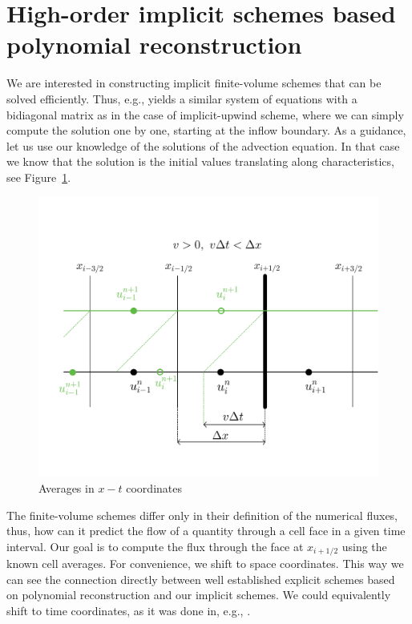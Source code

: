 \documentclass[../thesis.tex]{subfiles}
\begin{document}
\graphicspath{ {./img/} }
\section[]{High-order implicit schemes based polynomial reconstruction}
We are interested in constructing implicit finite-volume schemes that can be solved efficiently. Thus, e.g., yields a similar system of equations with a bidiagonal matrix as in the case of implicit-upwind scheme, where we can simply compute the solution one by one, starting at the inflow boundary.
As a guidance, let us use our knowledge of the solutions of the advection equation. In that case we know that the solution is the initial values translating along characteristics, see Figure~\ref{fig:characteristics-1d}.
\begin{figure}[H]
	\centering
	\includegraphics[width=\textwidth]{Characteristics-crop.pdf}
	\caption{Averages in \(x-t\) coordinates}
	\label{fig:characteristics-1d}
\end{figure}
The finite-volume schemes differ only in their definition of the numerical fluxes, thus, how can it predict the flow of a quantity through a cell face in a given time interval.
Our goal is to compute the flux through the face at \(x_{i+1/2}\) using the known cell averages.
For convenience, we shift to space coordinates.
This way we can see the connection directly between well established explicit schemes based on polynomial reconstruction \cite{1977_VanLeer,2002_LeVeque_BOOK} and our implicit schemes.
We could equivalently shift to time coordinates, as it was done in, e.g., \cite{2023_Barsukow,2022_Eimer}.
\end{document}
